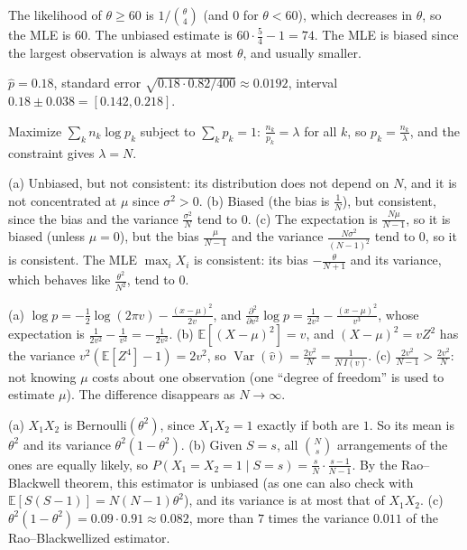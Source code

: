 \documentclass[11pt]{article}
\newcommand{\E}{\mathbb{E}}
\DeclareMathOperator{\Var}{Var}
\begin{document}
\begin{description}[leftmargin=0pt, itemsep=0.3em]
    \item[\ref{pr:german-tank}.] The likelihood of $\theta \geq 60$ is $1/\binom{\theta}{4}$ (and $0$ for $\theta < 60$), which decreases in $\theta$, so the MLE is $60$. The unbiased estimate is $60 \cdot \frac{5}{4} - 1 = 74$. The MLE is biased since the largest observation is always at most $\theta$, and usually smaller.
    \item[\ref{pr:click-ci}.] $\hat p = 0.18$, standard error $\sqrt{0.18 \cdot 0.82/400} \approx 0.0192$, interval $0.18 \pm 0.038 = [0.142, 0.218]$.
    \item[\ref{pr:categorical-mle}.] Maximize $\sum_k n_k\log p_k$ subject to $\sum_k p_k = 1$: $\frac{n_k}{p_k} = \lambda$ for all $k$, so $p_k = \frac{n_k}{\lambda}$, and the constraint gives $\lambda = N$.
    \item[\ref{pr:consistency}.] (a) Unbiased, but not consistent: its distribution does not depend on $N$, and it is not concentrated at $\mu$ since $\sigma^2 > 0$. (b) Biased (the bias is $\frac{1}{N}$), but consistent, since the bias and the variance $\frac{\sigma^2}{N}$ tend to $0$. (c) The expectation is $\frac{N\mu}{N - 1}$, so it is biased (unless $\mu = 0$), but the bias $\frac{\mu}{N - 1}$ and the variance $\frac{N\sigma^2}{(N - 1)^2}$ tend to $0$, so it is consistent. The MLE $\max_i X_i$ is consistent: its bias $-\frac{\theta}{N + 1}$ and its variance, which behaves like $\frac{\theta^2}{N^2}$, tend to $0$.
    \item[\ref{pr:cr-variance}.] (a) $\log p = -\frac{1}{2}\log(2\pi v) - \frac{(x - \mu)^2}{2v}$, and $\frac{\partial^2}{\partial v^2}\log p = \frac{1}{2v^2} - \frac{(x - \mu)^2}{v^3}$, whose expectation is $\frac{1}{2v^2} - \frac{1}{v^2} = -\frac{1}{2v^2}$. (b) $\E[(X - \mu)^2] = v$, and $(X - \mu)^2 = vZ^2$ has the variance $v^2(\E[Z^4] - 1) = 2v^2$, so $\Var(\hat v) = \frac{2v^2}{N} = \frac{1}{N\,I(v)}$. (c) $\frac{2v^2}{N - 1} > \frac{2v^2}{N}$: not knowing $\mu$ costs about one observation (one ``degree of freedom'' is used to estimate $\mu$). The difference disappears as $N \to \infty$.
    \item[\ref{pr:rao-blackwell}.] (a) $X_1X_2$ is Bernoulli$(\theta^2)$, since $X_1X_2 = 1$ exactly if both are $1$. So its mean is $\theta^2$ and its variance $\theta^2(1 - \theta^2)$. (b) Given $S = s$, all $\binom{N}{s}$ arrangements of the ones are equally likely, so $P(X_1 = X_2 = 1 \mid S = s) = \frac{s}{N} \cdot \frac{s - 1}{N - 1}$. By the Rao--Blackwell theorem, this estimator is unbiased (as one can also check with $\E[S(S - 1)] = N(N - 1)\theta^2$), and its variance is at most that of $X_1X_2$. (c) $\theta^2(1 - \theta^2) = 0.09 \cdot 0.91 \approx 0.082$, more than $7$ times the variance $0.011$ of the Rao--Blackwellized estimator.

\end{description}
\end{document}
